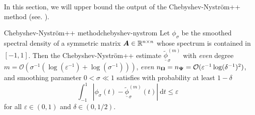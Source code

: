 In this section, we will upper bound the output of the Chebyshev-Nyström++ method (see. ). 
\begin{theorem}{Chebyshev-Nyström++ method}{chebyshev-nystrom}
    Let $\phi_{\sigma}$ be the smoothed spectral density of a symmetric matrix $\boldsymbol{A} \in \mathbb{R}^{n \times n}$ whose spectrum is contained in $[-1, 1]$. Then the Chebyshev-Nyström++ estimate $\widetilde{\underline{\phi}}_{\sigma}^{(m)}$ with \emph{even} degree $m = \mathcal{O}(\sigma^{-1}(\log(\varepsilon^{-1}) + \log(\sigma^{-1})))$, \emph{even} $n_{\boldsymbol{\Omega}} = n_{\boldsymbol{\Psi}} = \mathcal{O}(\varepsilon^{-1}\log(\delta^{-1})^2)$, and smoothing parameter $0 < \sigma \ll 1$ satisfies with probability at least $1 - \delta$
    \begin{equation}
        \int_{-1}^{1} \left| \phi_{\sigma}(t) - \widetilde{\underline{\phi}}_{\sigma}^{(m)}(t) \right|~\mathrm{d}t \leq \varepsilon
        \label{equ:chebyshev-nystrom-error}
    \end{equation}
    for all $\varepsilon \in (0, 1)$ and $\delta \in (0, 1/2)$.
\end{theorem}

